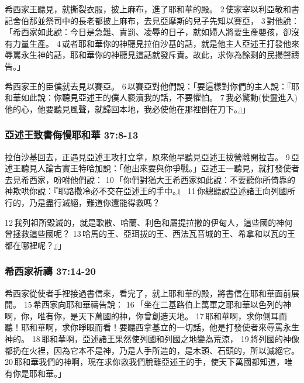 希西家王聽見，就撕裂衣服，披上麻布，進了耶和華的殿。 2 使家宰以利亞敬和書記舍伯那並祭司中的長老都披上麻布，去見亞摩斯的兒子先知以賽亞， 3 對他說：「希西家如此說：今日是急難、責罰、凌辱的日子，就如婦人將要生產嬰孩，卻沒有力量生產。 4 或者耶和華你的神聽見拉伯沙基的話，就是他主人亞述王打發他來辱罵永生神的話，耶和華你的神聽見這話就發斥責。故此，求你為餘剩的民揚聲禱告。」

希西家王的臣僕就去見以賽亞。 6 以賽亞對他們說：「要這樣對你們的主人說：『耶和華如此說：你聽見亞述王的僕人褻瀆我的話，不要懼怕。 7 我必驚動(使靈進入)他的心，他要聽見風聲，就歸回本地，我必使他在那裡倒在刀下。』」


\subsubsection{亞述王致書侮慢耶和華 37:8-13}

拉伯沙基回去，正遇見亞述王攻打立拿，原來他早聽見亞述王拔營離開拉吉。 9 亞述王聽見人論古實王特哈加說：「他出來要與你爭戰。」亞述王一聽見，就打發使者去見希西家，吩咐他們說： 10 「你們對猶大王希西家如此說：不要聽你所倚靠的神欺哄你說：『耶路撒冷必不交在亞述王的手中。』 11 你總聽說亞述諸王向列國所行的，乃是盡行滅絕，難道你還能得救嗎？

12 我列祖所毀滅的，就是歌散、哈蘭、利色和屬提拉撒的伊甸人，這些國的神何曾拯救這些國呢？ 13 哈馬的王、亞珥拔的王、西法瓦音城的王、希拿和以瓦的王都在哪裡呢？』」

\subsubsection{希西家祈禱 37:14-20}
希西家從使者手裡接過書信來，看完了，就上耶和華的殿，將書信在耶和華面前展開。 15 希西家向耶和華禱告說： 16 「坐在二基路伯上萬軍之耶和華以色列的神啊，你，唯有你，是天下萬國的神，你曾創造天地。 17 耶和華啊，求你側耳而聽！耶和華啊，求你睜眼而看！要聽西拿基立的一切話，他是打發使者來辱罵永生神的。 18 耶和華啊，亞述諸王果然使列國和列國之地變為荒涼， 19 將列國的神像都扔在火裡，因為它本不是神，乃是人手所造的，是木頭、石頭的，所以滅絕它。 20 耶和華我們的神啊，現在求你救我們脫離亞述王的手，使天下萬國都知道，唯有你是耶和華。」

